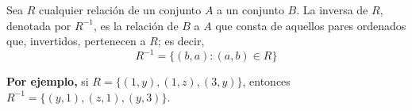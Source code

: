 
 \noindent      Sea $R$ cualquier relación de un conjunto $A$ a un conjunto $B$. La inversa de $R$, denotada por $R^{-1}$, es la relación de $B$ a $A$ que consta de aquellos pares ordenados que, invertidos, pertenecen a $R$; es decir,
    \[
    R^{-1} = \{(b, a) : (a, b) \in R\}
    \]
    
 \noindent     \textbf{Por ejemplo,} si $R = \{(1, y), (1, z), (3, y)\}$, entonces $R^{-1} = \{(y, 1), (z, 1), (y, 3)\}$.